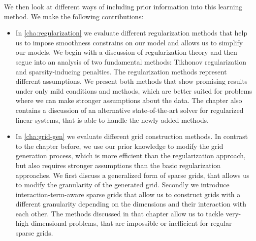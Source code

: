 We then look at different ways of including prior information into this learning method.
We make the following contributions:
\begin{itemize}
\item In \cref{cha:regularization} we evaluate different regularization
  methods that help us to impose smoothness constrains on our model and allows us
  to simplify our models.
  We begin with a discussion of regularization theory and then segue into an
  analysis of two fundamental methods: Tikhonov regularization and
  sparsity-inducing penalties.
  The regularization methods represent different assumptions.
  We present both methods that show promising results under only mild conditions
  and methods, which are better suited for problems where we can make stronger
  assumptions about the data.
  The chapter also contains a discussion of an alternative state-of-the-art solver for regularized linear systems, that is able to handle the newly added methods.
\item In \cref{cha:grid-gen} we evaluate different grid construction methods.
  In contrast to the chapter before, we use our prior knowledge to modify the
  grid generation process, which is more efficient than the regularization
  approach, but also requires stronger assumptions than the basic regularization approaches.
  We first discuss a generalized form of sparse grids, that allows us to modify
  the granularity of the generated grid.
  Secondly we introduce interaction-term-aware sparse grids that allow us to construct grids with a different granularity depending on the dimensions and their interaction with each other.
  The methods discussed in that chapter allow us to tackle very-high dimensional problems, that are impossible or inefficient for regular sparse grids.
\end{itemize}

